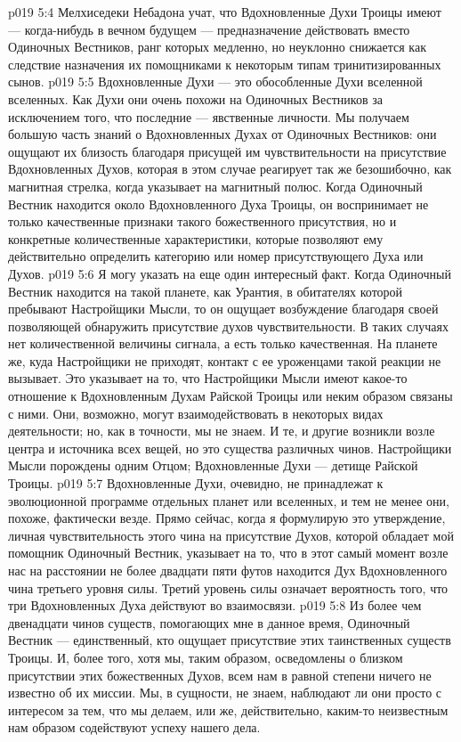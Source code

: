 \vs p019 5:4 Мелхиседеки Небадона учат, что Вдохновленные Духи Троицы имеют --- когда\hyp{}нибудь в вечном будущем --- предназначение действовать вместо Одиночных Вестников, ранг которых медленно, но неуклонно снижается как следствие назначения их помощниками к некоторым типам тринитизированных сынов.
\vs p019 5:5 \pc Вдохновленные Духи --- это обособленные Духи вселенной вселенных. Как Духи они очень похожи на Одиночных Вестников за исключением того, что последние --- явственные личности. Мы получаем большую часть знаний о Вдохновленных Духах от Одиночных Вестников: они ощущают их близость благодаря присущей им чувствительности на присутствие Вдохновленных Духов, которая в этом случае реагирует так же безошибочно, как магнитная стрелка, когда указывает на магнитный полюс. Когда Одиночный Вестник находится около Вдохновленного Духа Троицы, он воспринимает не только качественные признаки такого божественного присутствия, но и конкретные количественные характеристики, которые позволяют ему действительно определить категорию или номер присутствующего Духа или Духов.
\vs p019 5:6 Я могу указать на еще один интересный факт. Когда Одиночный Вестник находится на такой планете, как Урантия, в обитателях которой пребывают Настройщики Мысли, то он ощущает возбуждение благодаря своей позволяющей обнаружить присутствие духов чувствительности. В таких случаях нет количественной величины сигнала, а есть только качественная. На планете же, куда Настройщики не приходят, контакт с ее уроженцами такой реакции не вызывает. Это указывает на то, что Настройщики Мысли имеют какое\hyp{}то отношение к Вдохновленным Духам Райской Троицы или неким образом связаны с ними. Они, возможно, могут взаимодействовать в некоторых видах деятельности; но, как в точности, мы не знаем. И те, и другие возникли возле центра и источника всех вещей, но это существа различных чинов. Настройщики Мысли порождены одним Отцом; Вдохновленные Духи --- детище Райской Троицы.
\vs p019 5:7 Вдохновленные Духи, очевидно, не принадлежат к эволюционной программе отдельных планет или вселенных, и тем не менее они, похоже, фактически везде. Прямо сейчас, когда я формулирую это утверждение, личная чувствительность этого чина на присутствие Духов, которой обладает мой помощник Одиночный Вестник, указывает на то, что в этот самый момент возле нас на расстоянии не более двадцати пяти футов находится Дух Вдохновленного чина третьего уровня силы. Третий уровень силы означает вероятность того, что три Вдохновленных Духа действуют во взаимосвязи.
\vs p019 5:8 \pc Из более чем двенадцати чинов существ, помогающих мне в данное время, Одиночный Вестник --- единственный, кто ощущает присутствие этих таинственных существ Троицы. И, более того, хотя мы, таким образом, осведомлены о близком присутствии этих божественных Духов, всем нам в равной степени ничего не известно об их миссии. Мы, в сущности, не знаем, наблюдают ли они просто с интересом за тем, что мы делаем, или же, действительно, каким\hyp{}то неизвестным нам образом содействуют успеху нашего дела.
